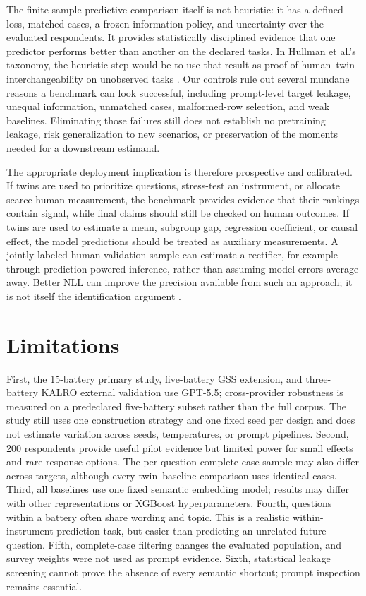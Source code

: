 \documentclass[11pt]{article}
\begin{document}
The finite-sample predictive comparison itself is not heuristic: it has a
defined loss, matched cases, a frozen information policy, and uncertainty over
the evaluated respondents. It provides statistically disciplined evidence that
one predictor performs better than another on the declared tasks. In Hullman et
al.'s taxonomy, the heuristic step would be to use that result as proof of
human--twin interchangeability on unobserved tasks \citep{hullman2026human}.
Our controls rule out several mundane reasons a benchmark can look successful,
including prompt-level target leakage, unequal information, unmatched cases,
malformed-row selection, and weak baselines. Eliminating those failures still
does not establish no pretraining leakage, risk generalization to new scenarios,
or preservation of the moments needed for a downstream estimand.

The appropriate deployment implication is therefore prospective and
calibrated. If twins are used to prioritize questions, stress-test an
instrument, or allocate scarce human measurement, the benchmark provides
evidence that their rankings contain signal, while final claims should still be
checked on human outcomes. If twins are used to estimate a mean, subgroup gap,
regression coefficient, or causal effect, the model predictions should be
treated as auxiliary measurements. A jointly labeled human validation sample
can estimate a rectifier, for example through prediction-powered inference,
rather than assuming model errors average away. Better NLL can improve the
precision available from such an approach; it is not itself the identification
argument \citep{ludwig2025llm}.

\section{Limitations}
First, the 15-battery primary study, five-battery GSS extension, and
three-battery KALRO external validation use GPT-5.5; cross-provider robustness is
measured on a predeclared five-battery subset rather than the full corpus. The
study still uses one construction strategy and one fixed seed per design and
does not estimate variation across seeds, temperatures, or prompt pipelines.
Second, 200 respondents provide
useful pilot evidence but limited power for small effects and rare response
options. The per-question complete-case sample may also differ across targets,
although every twin--baseline comparison uses identical cases. Third, all
baselines use one fixed semantic embedding model; results may differ with other
representations or XGBoost hyperparameters. Fourth,
questions within a battery often share wording and topic. This is a realistic
within-instrument prediction task, but easier than predicting an unrelated
future question. Fifth, complete-case filtering changes the evaluated
population, and survey weights were not used as prompt evidence. Sixth,
statistical leakage screening cannot prove the absence of every semantic
shortcut; prompt inspection remains essential.
\end{document}
